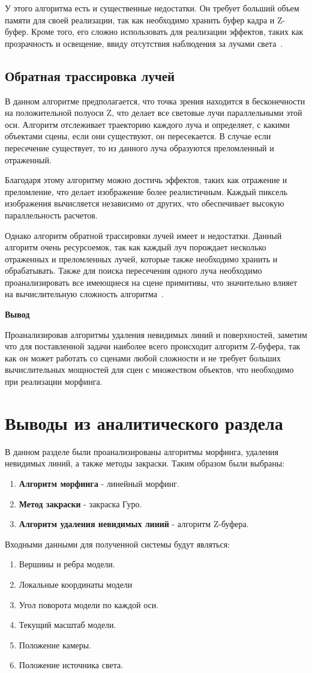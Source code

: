 У этого алгоритма есть и существенные недостатки. 
Он требует больший объем памяти для своей реализации, так как необходимо хранить буфер кадра и Z-буфер.
Кроме того, его сложно использовать для реализации эффектов, таких как прозрачность и освещение, ввиду отсутствия 
наблюдения за лучами света~\cite{Rodgers}.

\subsection{Обратная трассировка лучей}
В данном алгоритме предполагается, что точка зрения находится в бесконечности на положительной полуоси Z, что делает все световые лучи параллельными этой оси. 
Алгоритм отслеживает траекторию каждого луча и определяет, с какими объектами сцены, если они существуют, он пересекается.
В случае если пересечение существует, то из данного луча образуются преломленный и отраженный.

Благодаря этому алгоритму можно достичь эффектов, таких как отражение и преломление, что делает изображение более реалистичным. 
Каждый пиксель изображения вычисляется независимо от других, что обеспечивает высокую параллельность расчетов.

Однако алгоритм обратной трассировки лучей имеет и недостатки.
Данный алгоритм очень ресурсоемок, так как каждый луч порождает несколько отраженных и преломленных лучей, которые также необходимо хранить и обрабатывать.
Также для поиска пересечения одного луча необходимо проанализировать все имеющиеся на сцене примитивы, что значительно влияет на вычислительную сложность алгоритма~\cite{Rodgers}.

\textbf{Вывод}

Проанализировав алгоритмы удаления невидимых линий и поверхностей, заметим что для поставленной задачи наиболее всего происходит алгоритм Z-буфера, так как он может работать со сценами любой сложности и не требует больших вычислительных мощностей для сцен с множеством объектов, что  необходимо при реализации морфинга.


\section*{Выводы из аналитического раздела}

В данном разделе были проанализированы алгоритмы морфинга, удаления невидимых линий, а также методы закраски.
Таким образом были выбраны:
\begin{enumerate}
	\item \textbf{Алгоритм морфинга} - линейный морфинг.
	\item \textbf{Метод закраски} - закраска Гуро.
	\item \textbf{Алгоритм удаления невидимых линий} - алгоритм Z-буфера.
\end{enumerate}

Входными данными для полученной системы будут являться:
\begin{enumerate}
	\item Вершины и ребра модели.
	\item Локальные координаты модели
	\item Угол поворота модели по каждой оси.
	\item Текущий масштаб модели.
	\item Положение камеры.
	\item Положение источника света.
\end{enumerate}